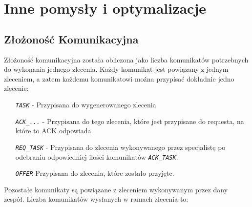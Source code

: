 \documentclass[12pt]{article}
\newcommand{\msg}[1]{\texttt{\emph{#1}}}
\begin{document}
\section{Inne pomysły i optymalizacje}
\subsection{Złożoność Komunikacyjna}
Złożoność komunikacyjna została obliczona jako liczba komunikatów potrzebnych do wykonania jednego zlecenia. Każdy komunikat jest powiązany z jednym zleceniem, a zatem każdemu komunikatowi można przypisać dokładnie jedno zlecenie:
\begin{enumerate}
	\item[\msg{TASK}] - Przypisana do wygenerowanego zlecenia
	\item[\msg{ACK\_...}] - Przypisana do tego zlecenia, które jest przypisane do requesta, na które to ACK odpowiada
	\item[\msg{REQ\_TASK}] - Przypisana do zlecenia wykonywanego przez specjalistę po odebraniu odpowiedniej ilości komunikatów \msg{ACK\_TASK}.
	\item[\msg{OFFER}] Przypisana do zlecenia, które zostało przyjęte.
\end{enumerate}
Pozostałe komunikaty są powiązane z zleceniem wykonywanym przez dany zespół. Liczba komunikatów wysłanych w ramach zlecenia to:
\end{document}
